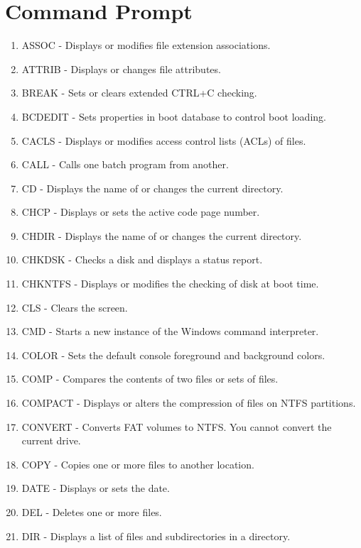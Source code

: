 \documentclass[11pt,a4paper,twoside]{article}
\begin{document}
\section{Command Prompt}
\begin{enumerate}
\item ASSOC          	-	Displays or modifies file extension associations.
\item ATTRIB         	-	Displays or changes file attributes.
\item BREAK          	-	Sets or clears extended CTRL+C checking.
\item BCDEDIT        	-	Sets properties in boot database to control boot loading.
\item CACLS          	-	Displays or modifies access control lists (ACLs) of files.
\item CALL           	-	Calls one batch program from another.
\item CD             	-	Displays the name of or changes the current directory.
\item CHCP           	-	Displays or sets the active code page number.
\item CHDIR          	-	Displays the name of or changes the current directory.
\item CHKDSK         	-	Checks a disk and displays a status report.
\item CHKNTFS        	-	Displays or modifies the checking of disk at boot time.
\item CLS            	-	Clears the screen.
\item CMD            	-	Starts a new instance of the Windows command interpreter.
\item COLOR          	-	Sets the default console foreground and background colors.
\item COMP           	-	Compares the contents of two files or sets of files.
\item COMPACT        	-	Displays or alters the compression of files on NTFS partitions.
\item CONVERT        	-	Converts FAT volumes to NTFS.  You cannot convert the current drive.
\item COPY           	-	Copies one or more files to another location.
\item DATE           	-	Displays or sets the date.
\item DEL            	-	Deletes one or more files.
\item DIR            	-	Displays a list of files and subdirectories in a directory.

\end{enumerate}
\end{document}
